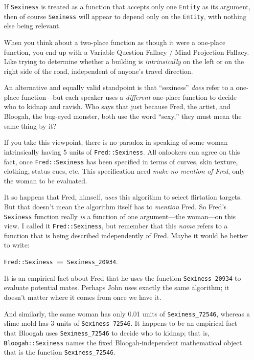  If \texttt{Sexiness} is treated as a function that accepts only one \texttt{Entity}
as its argument, then of course \texttt{Sexiness} will appear to depend only on
the \texttt{Entity}, with nothing else being relevant.


 When you think about a two-place function as though it were a
one-place function, you end up with a Variable Question Fallacy / Mind
Projection Fallacy. Like trying to determine whether a building is
\textit{intrinsically} on the left or on the right side of the road,
independent of anyone's travel direction.


 An alternative and equally valid standpoint is that
``sexiness'' \textit{does} refer to
a one-place function---but each speaker uses a \textit{different}
one-place function to decide who to kidnap and ravish. Who says that
just because Fred, the artist, and Bloogah, the bug-eyed monster, both
use the word ``sexy,'' they must
mean the same thing by it?


 If you take this viewpoint, there is no paradox in speaking of
some woman intrinsically having 5 units of \texttt{Fred::Sexiness}. All
onlookers can agree on this fact, once \texttt{Fred::Sexiness} has been
specified in terms of curves, skin texture, clothing, status cues, etc.
This specification need \textit{make no mention of Fred}, only the
woman to be evaluated.


 It so happens that Fred, himself, \textit{uses} this algorithm to
select flirtation targets. But that doesn't mean the
algorithm itself has to \textit{mention} Fred. So
Fred's \texttt{Sexiness} function really \textit{is} a function
of one argument---the woman---on this view. I called it \texttt{Fred::Sexiness},
but remember that this \textit{name} refers to a function that is being
described independently of Fred. Maybe it would be better to write:

\begin{center}
\texttt{Fred::Sexiness == Sexiness\_20934}.
\end{center}


 It is an empirical fact about Fred that he uses the function
\texttt{Sexiness\_20934} to evaluate potential mates. Perhaps John uses exactly
the same algorithm; it doesn't matter where it comes
from once we have it.


 And similarly, the same woman has only 0.01 units of
\texttt{Sexiness\_72546}, whereas a slime mold has 3 units of \texttt{Sexiness\_72546}.
It happens to be an empirical fact that Bloogah uses \texttt{Sexiness\_72546} to
decide who to kidnap; that is, \texttt{Bloogah::Sexiness} names the fixed
Bloogah-independent mathematical object that is the function
\texttt{Sexiness\_72546}.



